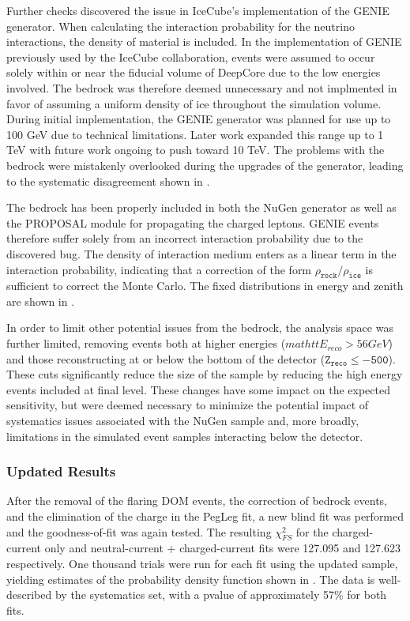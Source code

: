 Further checks discovered the issue in IceCube's implementation of the GENIE generator.
When calculating the interaction probability for the neutrino interactions, the density of material is included.
In the implementation of GENIE previously used by the IceCube collaboration, events were assumed to occur solely within or near the fiducial volume of DeepCore due to the low energies involved.
The bedrock was therefore deemed unnecessary and not implmented in favor of assuming a uniform density of ice throughout the simulation volume.
During initial implementation, the GENIE generator was planned for use up to 100 GeV due to technical limitations. 
Later work expanded this range up to 1 TeV with future work ongoing to push toward 10 TeV.
The problems with the bedrock were mistakenly overlooked during the upgrades of the generator, leading to the systematic disagreement shown in .

The bedrock has been properly included in both the NuGen generator as well as the PROPOSAL module for propagating the charged leptons.
GENIE events therefore suffer solely from an incorrect interaction probability due to the discovered bug.
The density of interaction medium enters as a linear term in the interaction probability, indicating that a correction of the form $\mathtt{\rho_{rock}/\rho_{ice}}$ is sufficient to correct the Monte Carlo.
The fixed distributions in energy and zenith are shown in .

In order to limit other potential issues from the bedrock, the analysis space was further limited, removing events both at higher energies ($mathtt{E_{reco}>56 GeV}$) and those reconstructing at or below the bottom of the detector ($\mathtt{Z_{reco}\leq-500}$).
These cuts significantly reduce the size of the sample by reducing the high energy events included at final level. 
These changes have some impact on the expected sensitivity, but were deemed necessary to minimize the potential impact of systematics issues associated with the NuGen sample and, more broadly, limitations in the simulated event samples interacting below the detector.


\label{subsubsec:final_blind_fits}
\subsubsection{Updated Results}
After the removal of the flaring DOM events, the correction of bedrock events, and the elimination of the charge in the PegLeg fit, a new blind fit was performed and the goodness-of-fit was again tested.
The resulting $\chi^2_{FS}$ for the charged-current only and neutral-current + charged-current fits were 127.095 and 127.623 respectively.
One thousand trials were run for each fit using the updated sample, yielding estimates of the probability density function shown in .
The data is well-described by the systematics set, with a pvalue of approximately 57\% for both fits.

